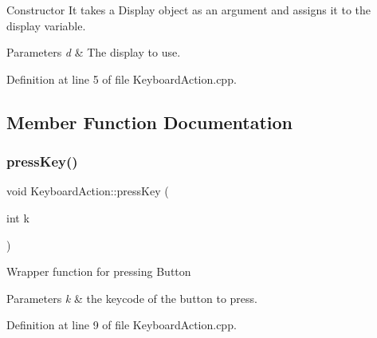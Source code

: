 Constructor It takes a Display object as an argument and assigns it to the display variable.


\begin{DoxyParams}{Parameters}
{\em d} & The display to use. \\
\hline
\end{DoxyParams}


Definition at line 5 of file Keyboard\+Action.\+cpp.



\subsection{Member Function Documentation}
\mbox{\label{class_ubuntu_controller_1_1_keyboard_action_ab09e3956685d6fb11cd1cdf86a673b48}} 
\subsubsection{\texorpdfstring{press\+Key()}{pressKey()}}
{\footnotesize\ttfamily void Keyboard\+Action\+::press\+Key (\begin{DoxyParamCaption}\item[{int}]{k }\end{DoxyParamCaption})}

Wrapper function for pressing Button


\begin{DoxyParams}{Parameters}
{\em k} & the keycode of the button to press. \\
\hline
\end{DoxyParams}


Definition at line 9 of file Keyboard\+Action.\+cpp.

